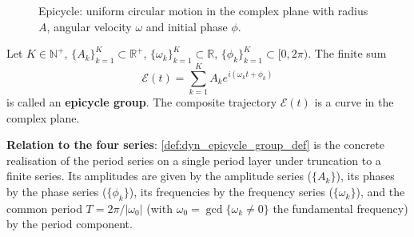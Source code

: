 \begin{figure}[htbp]
\centering
{}
\caption{Epicycle: uniform circular motion in the complex plane with radius $A$, angular velocity $\omega$ and initial phase $\phi$.}
\label{fig:dyn_epicycle}
\end{figure}

\begin{definition}\label{def:dyn_epicycle_group_def}
Let $K\in\mathbb N^+$, $\{A_k\}_{k=1}^{K}\subset\mathbb R^+$, $\{\omega_k\}_{k=1}^{K}\subset\mathbb R$, $\{\phi_k\}_{k=1}^{K}\subset[0,2\pi)$. The finite sum
\[
\mathcal E(t)=\sum_{k=1}^{K}A_k e^{i(\omega_k t+\phi_k)}
\]
is called an \textbf{epicycle group}. The composite trajectory $\mathcal E(t)$ is a curve in the complex plane.

\textbf{Relation to the four series}: \cref{def:dyn_epicycle_group_def} is the concrete realisation of the period series on a single period layer under truncation to a finite series. Its amplitudes are given by the amplitude series ($\{A_k\}$), its phases by the phase series ($\{\phi_k\}$), its frequencies by the frequency series ($\{\omega_k\}$), and the common period $T=2\pi/\lvert\omega_0\rvert$ (with $\omega_0=\gcd\{\omega_k\ne0\}$ the fundamental frequency) by the period component.
\end{definition}

